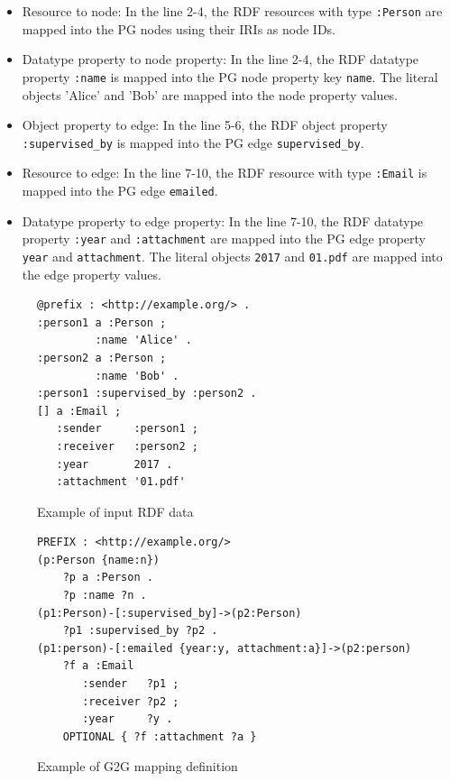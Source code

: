 \documentclass[runningheads]{llncs}
\begin{document}
\begin{itemize}
    \item Resource to node: In the line 2-4, the RDF resources with type \texttt{:Person} are mapped into the PG nodes using their IRIs as node IDs.
    \item Datatype property to node property: In the line 2-4, the RDF datatype property \texttt{:name} is mapped into the PG node property key \texttt{name}. The literal objects 'Alice' and 'Bob' are mapped into the node property values.
    \item Object property to edge: In the line 5-6, the RDF object property \texttt{:supervised\_by} is mapped into the PG edge \texttt{supervised\_by}.
    \item Resource to edge: In the line 7-10, the RDF resource with type \texttt{:Email} is mapped into the PG edge \texttt{emailed}. 
    \item Datatype property to edge property: In the line 7-10, the RDF datatype property \texttt{:year} and \texttt{:attachment} are mapped into the PG edge property \texttt{year} and \texttt{attachment}. The literal objects \texttt{2017} and \texttt{01.pdf} are mapped into the edge property values.
\end{itemize}


\begin{figure}[!t]
\begin{scriptsize}
\begin{verbatim}
@prefix : <http://example.org/> .
:person1 a :Person ;
         :name 'Alice' .
:person2 a :Person ;
         :name 'Bob' .
:person1 :supervised_by :person2 .
[] a :Email ;
   :sender     :person1 ;
   :receiver   :person2 ;
   :year       2017 .
   :attachment '01.pdf'
\end{verbatim}
\end{scriptsize}
\caption{Example of input RDF data}
\label{fig:example-rdf}
\end{figure}


\begin{figure}[!t]
\begin{scriptsize}
\begin{verbatim}
PREFIX : <http://example.org/>
(p:Person {name:n})
    ?p a :Person .
    ?p :name ?n .
(p1:Person)-[:supervised_by]->(p2:Person)
    ?p1 :supervised_by ?p2 .
(p1:person)-[:emailed {year:y, attachment:a}]->(p2:person)
    ?f a :Email
       :sender   ?p1 ;
       :receiver ?p2 ;
       :year     ?y .
    OPTIONAL { ?f :attachment ?a }
\end{verbatim}
\end{scriptsize}
\caption{Example of G2G mapping definition}
\label{fig:example-g2g}
\end{figure}
\end{document}
